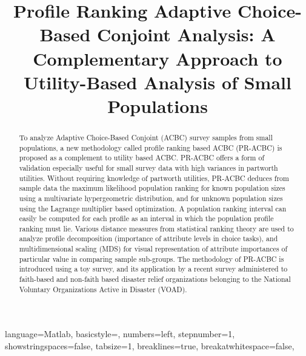 \documentclass[a4paper, 12pt]{article}
\title {Profile Ranking Adaptive Choice-Based Conjoint Analysis: A Complementary Approach to Utility-Based Analysis of Small Populations}
\author[1]{}
\date{}
\begin{document}
\lstset
{ %
    language=Matlab,
    basicstyle=\scriptsize,
    numbers=left,
    stepnumber=1,
    showstringspaces=false,
    tabsize=1,
    breaklines=true,
    breakatwhitespace=false,
}
\maketitle
\hrulefill



 \vspace{.7in}

 \begin{abstract}
To analyze Adaptive Choice-Based Conjoint (ACBC) survey samples from small populations, a new methodology called profile ranking based ACBC (PR-ACBC) is proposed as a complement to utility based  ACBC. PR-ACBC offers a form of validation especially useful for small survey data with high variances in partworth utilities. Without requiring knowledge of partworth utilities, PR-ACBC deduces from sample data the maximum likelihood population ranking for known population sizes using a multivariate hypergeometric distribution, and for unknown population sizes using the Lagrange multiplier based optimization. A population ranking interval can easily be computed  for each profile as an interval in which the population profile ranking must lie.  Various distance measures from statistical ranking theory are used  to analyze profile decomposition (importance of attribute levels in choice tasks), and   multidimensional scaling (MDS)  for visual representation of attribute importances of particular value in comparing sample sub-groups.  The methodology of PR-ACBC is introduced using a toy survey, and its application  by a recent survey administered to  faith-based and non-faith based disaster relief organizations belonging to the National Voluntary Organizations Active in Disaster (VOAD).

\end{abstract}


\end{document}
